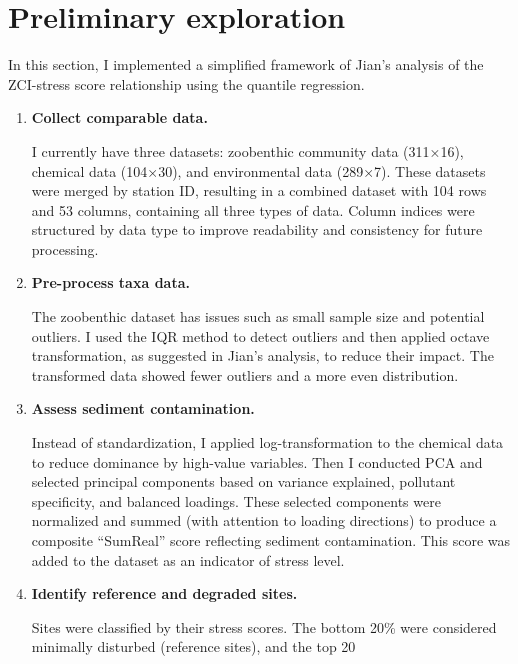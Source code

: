 \section{Preliminary exploration}

In this section, I implemented a simplified framework of 
Jian's analysis of the ZCI-stress score relationship using the quantile regression.
\begin{enumerate}

\item \textbf{Collect comparable data.}

I currently have three datasets: zoobenthic community data (311×16), chemical data (104×30), and environmental data (289×7). These datasets were merged by station ID, resulting in a combined dataset with 104 rows and 53 columns, containing all three types of data. Column indices were structured by data type to improve readability and consistency for future processing.

\item \textbf{Pre-process taxa data.}

The zoobenthic dataset has issues such as small sample size and potential outliers. I used the IQR method to detect outliers and then applied octave transformation, as suggested in Jian’s analysis, to reduce their impact. The transformed data showed fewer outliers and a more even distribution.

\item \textbf{Assess sediment contamination.}

Instead of standardization, I applied log-transformation to the chemical data to reduce dominance by high-value variables. Then I conducted PCA and selected principal components based on variance explained, pollutant specificity, and balanced loadings. These selected components were normalized and summed (with attention to loading directions) to produce a composite “SumReal” score reflecting sediment contamination. This score was added to the dataset as an indicator of stress level.

\item \textbf{Identify reference and degraded sites.}

Sites were classified by their stress scores. The bottom 20\% were considered minimally disturbed (reference sites), and the top 20%


\end{enumerate}
